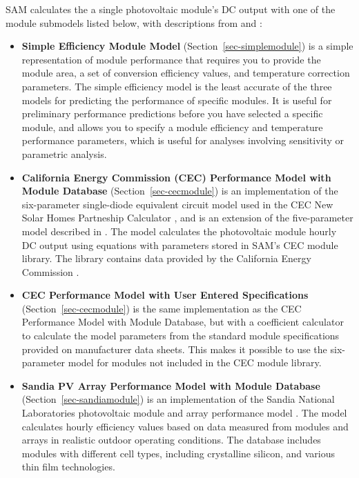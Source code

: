 \documentclass[12pt,letterpaper]{article}
\begin{document}
SAM calculates the a single photovoltaic module's DC output with one of the module submodels listed below, with descriptions from \citet{help-module} and \citet{blair2013}:

\begin{itemize}
\item \textbf{Simple Efficiency Module Model} (Section~\ref{sec-simplemodule}) is a simple representation of module performance that requires you to provide the module area, a set of conversion efficiency values, and temperature correction parameters. The simple efficiency model is the least accurate of the three models for predicting the performance of specific modules. It is useful for preliminary performance predictions before you have selected a specific module, and allows you to specify a module efficiency and temperature performance parameters, which is useful for analyses involving sensitivity or parametric analysis.
\item \textbf{California Energy Commission (CEC) Performance Model with Module Database} (Section~\ref{sec-cecmodule}) is an implementation of the six-parameter single-diode equivalent circuit model used in the CEC New Solar Homes Partneship Calculator \citep{gsc2014a}, and is an extension of the five-parameter model described in \citet{desoto2004a}. The model calculates the photovoltaic module hourly DC output using equations with parameters stored in SAM's CEC module library. The library contains data provided by the California Energy Commission \citep{gsc2014a} \citep{gsc2014b}.
\item \textbf{CEC Performance Model with User Entered Specifications}  (Section~\ref{sec-cecmodule}) is the same implementation as the CEC Performance Model with Module Database, but with a coefficient calculator \citep{dobos2012a} to calculate the model parameters from the standard module specifications provided on manufacturer data sheets. This makes it possible to use the six-parameter model for modules not included in the CEC module library.
\item \textbf{Sandia PV Array Performance Model with Module Database}  (Section~\ref{sec-sandiamodule}) is an implementation of the Sandia National Laboratories photovoltaic module and array performance model \citep{king2004}. The model calculates hourly efficiency values based on data measured from modules and arrays in realistic outdoor operating conditions. The database includes modules with different cell types, including crystalline silicon, and various thin film technologies.
\end{itemize}
\end{document}
